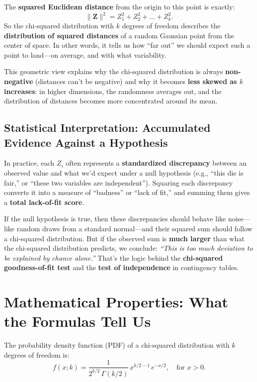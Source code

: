 \documentclass[12pt]{article}
\begin{document}
The \textbf{squared Euclidean distance} from the origin to this point is exactly:
\[
\|\mathbf{Z}\|^2 = Z_1^2 + Z_2^2 + \dots + Z_k^2.
\]
So the chi-squared distribution with $k$ degrees of freedom describes the \textbf{distribution of squared distances} of a random Gaussian point from the center of space. In other words, it tells us how ``far out'' we should expect such a point to land—on average, and with what variability.

This geometric view explains why the chi-squared distribution is always \textbf{non-negative} (distances can’t be negative) and why it becomes \textbf{less skewed as $k$ increases}: in higher dimensions, the randomness averages out, and the distribution of distances becomes more concentrated around its mean.

\subsection*{Statistical Interpretation: Accumulated Evidence Against a Hypothesis}

In practice, each $Z_i$ often represents a \textbf{standardized discrepancy} between an observed value and what we’d expect under a null hypothesis (e.g., ``this die is fair,'' or ``these two variables are independent''). Squaring each discrepancy converts it into a measure of ``badness'' or ``lack of fit,'' and summing them gives a \textbf{total lack-of-fit score}.

If the null hypothesis is true, then these discrepancies should behave like noise—like random draws from a standard normal—and their squared sum should follow a chi-squared distribution. But if the observed sum is \textbf{much larger} than what the chi-squared distribution predicts, we conclude: \emph{``This is too much deviation to be explained by chance alone.''} That’s the logic behind the \textbf{chi-squared goodness-of-fit test} and the \textbf{test of independence} in contingency tables.

\section*{Mathematical Properties: What the Formulas Tell Us}

The probability density function (PDF) of a chi-squared distribution with $k$ degrees of freedom is:
\[
f(x; k) = \frac{1}{2^{k/2} \, \Gamma(k/2)} \, x^{k/2 - 1} \, e^{-x/2}, \quad \text{for } x > 0.
\]
\end{document}
